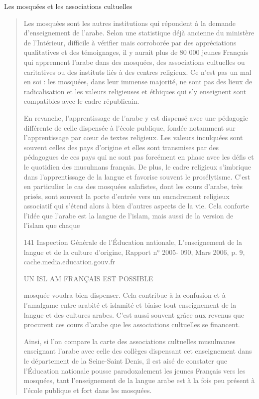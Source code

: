 Les mosquées et les associations cultuelles

\begin{quote}
Les mosquées sont les autres institutions qui répondent à la demande
d'enseignement de l'arabe. Selon une statistique déjà ancienne du
ministère de l'Intérieur, difficile à vérifier mais corroborée par des
appréciations qualitatives et des témoignages, il y aurait plus de 80
000 jeunes Français qui apprennent l'arabe dans des mosquées, des
associations cultuelles ou caritatives ou des instituts liés à des
centres religieux. Ce n'est pas un mal en soi : les mosquées, dans leur
immense majorité, ne sont pas des lieux de radicalisation et les valeurs
religieuses et éthiques qui s'y enseignent sont compatibles avec le
cadre républicain.

En revanche, l'apprentissage de l'arabe y est dispensé avec une
pédagogie différente de celle dispensée à l'école publique, fondée
notamment sur l'apprentissage par cœur de textes religieux. Les valeurs
inculquées sont souvent celles des pays d'origine et elles sont
transmises par des pédagogues de ces pays qui ne sont pas forcément en
phase avec les défis et le quotidien des musulmans français. De plus, le
cadre religieux s'imbrique dans l'apprentissage de la langue et favorise
souvent le prosélytisme. C'est en particulier le cas des mosquées
salafistes, dont les cours d'arabe, très prisés, sont souvent la porte
d'entrée vers un encadrement religieux associatif qui s'étend alors à
bien d'autres aspects de la vie. Cela conforte l'idée que l'arabe est la
langue de l'islam, mais aussi de la version de l'islam que chaque

141 Inspection Générale de l'Éducation nationale, L'enseignement de la
langue et de la culture d'origine, Rapport n° 2005- 090, Mars 2006, p.
9, cache.media.education.gouv.fr

UN ISL AM FRANÇAIS EST POSSIBLE

mosquée voudra bien dispenser. Cela contribue à la confusion et à
l'amalgame entre arabité et islamité et biaise tout enseignement de la
langue et des cultures arabes. C'est aussi souvent grâce aux revenus que
procurent ces cours d'arabe que les associations cultuelles se
financent.

Ainsi, si l'on compare la carte des associations cultuelles musulmanes
enseignant l'arabe avec celle des collèges dispensant cet enseignement
dans le département de la Seine-Saint Denis, il est aisé de constater
que l'Éducation nationale pousse paradoxalement les jeunes Français vers
les mosquées, tant l'enseignement de la langue arabe est à la fois peu
présent à l'école publique et fort dans les mosquées.
\end{quote}

